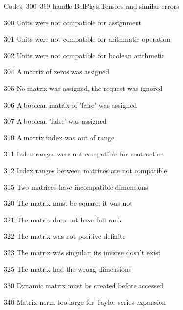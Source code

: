 \documentclass[twocolumn,twoside,fleqn,12pt]{article}
\newcommand{\namelistlabel}[1]{\mbox{#1}\hfil}
\newenvironment{namelist}[1]
   {\begin{list}{}%
      {\let\makelabel\namelistlabel%
       \settowidth{\labelwidth}{#1}%
       \setlength{\leftmargin}{1.1\labelwidth}%
       \setlength{\itemsep}{-6pt}%
      }%
   }{\end{list}%
}
\begin{document}
\newpage
Codes: 300--399  handle BelPhys.Tensors and similar errors
\begin{namelist}{9999}
   \item[300] Units were not compatible for assignment
   \item[301] Units were not compatible for arithmatic operation
   \item[302] Units were not compatible for boolean arithmetic
   \item[304] A matrix of zeros was assigned
   \item[305] No matrix was assigned, the request was ignored
   \item[306] A boolean matrix of 'false' was assigned
   \item[307] A boolean 'false' was assigned
   \item[310] A matrix index was out of range
   \item[311] Index ranges were not compatible for contraction
   \item[312] Index ranges between matrices are not compatible
   \item[315] Two matrices have incompatible dimensions
   \item[320] The matrix must be square; it was not
   \item[321] The matrix does not have full rank
   \item[322] The matrix was not positive definite
   \item[323] The matrix was singular; its inverse dosn't exist
   \item[325] The matrix had the wrong dimensions
   \item[330] Dynamic matrix must be created before accessed
   \item[340] Matrix norm too large for Taylor series expansion
\end{namelist}
\end{document}
